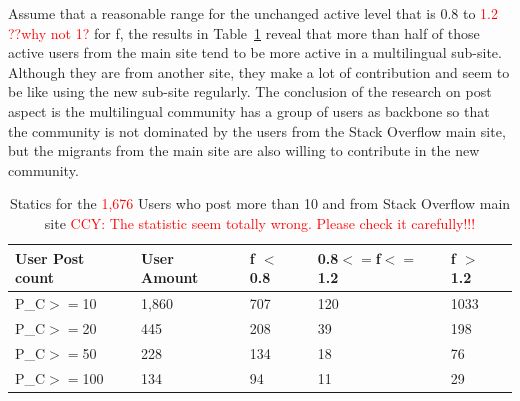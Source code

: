 	
Assume that a reasonable range for the unchanged active level that is 0.8 to \textcolor{red}{1.2 ??why not 1?} for f, the results in Table~\ref{tab:table3} reveal that more than half of those active users from the main site tend to be more active in a multilingual sub-site. Although they are from another site, they make a lot of contribution and seem to be like using the new sub-site regularly. The conclusion of the research on post aspect is the multilingual community has a group of users as backbone so that the community is not dominated by the users from the Stack Overflow main site, but the migrants from the main site are also willing to contribute in the new community.
\begin{table}
	\scriptsize
	\centering
	\caption{Statics for the \textcolor{red}{1,676} Users who post more than 10 and from Stack Overflow main site \textcolor{red}{CCY: The statistic seem totally wrong. Please check it carefully!!!}}
	\label{tab:table3}
	\begin{tabular}{p{1.1cm}|p{1.2cm}|p{0.8cm}|p{1.6cm}|p{0.8cm}}
		\hline
		User Post count & User Amount & f $<$ 0.8 & 0.8$<=$f$<=$1.2 &f $>$ 1.2 \\
		\hline
		P\_C$>=$10 & 1,860  &707 & 120 & 1033   \\
		P\_C$>=$20 & 445  & 208 & 39 & 198\\
		P\_C$>=$50 & 228 & 134 & 18 & 76 \\
		P\_C$>=$100& 134 & 94 & 11 & 29 \\
		\hline
	\end{tabular}
\end{table}	




